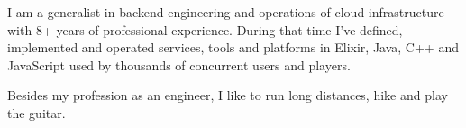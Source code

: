 

\begin{cvparagraph}

I am a generalist in backend engineering and operations of cloud infrastructure with 8+ years of professional experience. During that time I've defined, implemented and operated services, tools and platforms in Elixir, Java, C++ and JavaScript used by thousands of concurrent users and players. 



Besides my profession as an engineer, I like to run long distances, hike and play the guitar.









\end{cvparagraph}
